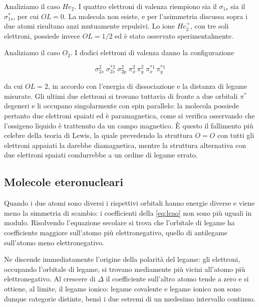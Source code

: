 Analiziamo il caso $He_2$. 
I quattro elettroni di valenza riempiono sia il $\sigma_{1s}$ sia il $\sigma^*_{1s}$, per cui $OL = 0$. La molecola non esiste, e per l'asimmetria discussa sopra i due atomi risultano anzi mutuamente repulsivi. Lo ione $He_2^+$, con tre soli elettroni, possiede invece $OL = 1/2$ ed è stato osservato sperimentalmente.\\

\newpage

Analiziamo il caso $O_2$.
I dodici elettroni di valenza danno la configurazione

\begin{equation*}
    \sigma_{2s}^2\;\sigma_{2s}^{*2}\;\sigma_{2p}^2\;\pi_x^2\,\pi_y^2\;
    \pi_x^{*1}\,\pi_y^{*1}
\end{equation*}

da cui $OL = 2$, in accordo con l'energia di dissociazione e la distanza di legame misurate. Gli ultimi due elettroni si trovano tuttavia di fronte a due orbitali $\pi^*$ degeneri e li occupano singolarmente con spin parallelo: la molecola possiede pertanto due elettroni spaiati ed è paramagnetica, come si verifica osservando che l'ossigeno liquido è trattenuto da un campo magnetico. È questo il fallimento più celebre della teoria di Lewis, la quale prevedendo la struttura $O=O$ con tutti gli elettroni appaiati la darebbe diamagnetica, mentre la struttura alternativa con due elettroni spaiati condurrebbe a un ordine di legame errato.


\subsection{Molecole eteronucleari}

Quando i due atomi sono diversi i rispettivi orbitali hanno energie diverse e viene meno la simmetria di scambio: i coefficienti della \eqref{eq:lcao} non sono più uguali in modulo. Risolvendo l'equazione secolare si trova che l'orbitale di legame ha coefficiente maggiore sull'atomo più elettronegativo, quello di antilegame sull'atomo meno elettronegativo.

Ne discende immediatamente l'origine della polarità del legame: gli elettroni, occupando l'orbitale di legame, si trovano mediamente più vicini all'atomo più elettronegativo. Al crescere di $\Delta$ il coefficiente sull'altro atomo tende a zero e si ottiene, al limite, il legame ionico: legame covalente e legame ionico non sono dunque categorie distinte, bensì i due estremi di un medesimo intervallo continuo.\\

